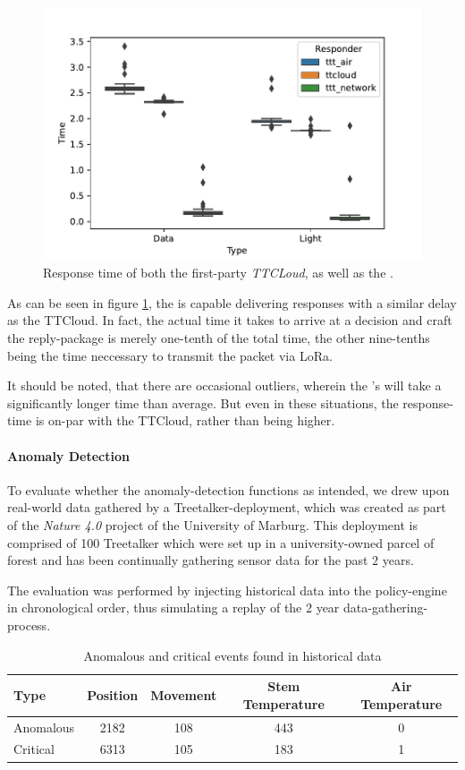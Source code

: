 \begin{figure}
    \centering
    \includegraphics[width=.8\linewidth]{figures/response_times.pdf}
    \caption{Response time of both the first-party \textit{TTCLoud}, as well as the \textit{\ttt}.}
    \label{fig:evaluation:ttt_response}
\end{figure}

As can be seen in figure \ref{fig:evaluation:ttt_response}, the \ttt is capable delivering responses with a similar delay as the TTCloud.
In fact, the actual time it takes to arrive at a decision and craft the reply-package is merely one-tenth of the total time, the other nine-tenths being the time neccessary to transmit the packet via LoRa.

It should be noted, that there are occasional outliers, wherein the {\ttt}'s will take a significantly longer time than average.
But even in these situations, the response-time is on-par with the TTCloud, rather than being higher.

\paragraph{Anomaly Detection}

To evaluate whether the anomaly-detection functions as intended, we drew upon real-world data gathered by a Treetalker-deployment, which was created as part of the \textit{Nature 4.0} project of the University of Marburg.
This deployment is comprised of 100 Treetalker which were set up in a university-owned parcel of forest and has been continually gathering sensor data for the past 2 years.

The evaluation was performed by injecting historical data into the policy-engine in chronological order, thus simulating a replay of the 2 year data-gathering-process.

\begin{table}
    \centering
    \begin{tabular}{l | c | c | c | c}
         Type & Position & Movement & Stem Temperature & Air Temperature  \\ \hline
         Anomalous & 2182 & 108 & 443 & 0 \\
         Critical & 6313 & 105 & 183 & 1
    \end{tabular}
    \caption{Anomalous and critical events found in historical data}
    \label{tab:evaluation:anomalies}
\end{table}

